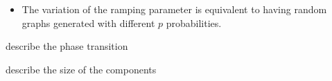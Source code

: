 \begin{itemize}
	\item The variation of the ramping parameter is equivalent to having random graphs generated with different $p$ probabilities.
\end{itemize}


describe the phase transition


describe the size of the components


